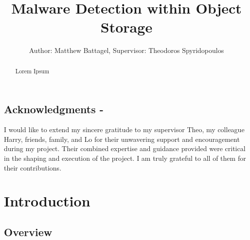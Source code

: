 \documentclass[12pt, conference, final, a4paper, onecolumn, compsoc]{IEEEtran}
\begin{document}
\title{Malware Detection within Object Storage} \author{Author: Matthew
  Battagel, Supervisor: Theodoros Spyridopoulos} 
\maketitle{}

\subsection*{Acknowledgments - }

I would like to extend my sincere gratitude to my supervisor Theo, my colleague
Harry, friends, family, and Lo for their unwavering support and encouragement
during my project. Their combined expertise and guidance provided were critical
in the shaping and execution of the project. I am truly grateful to all of them
for their contributions.

\bigskip

\begin{abstract}
  Lorem Ipsum
\end{abstract}

\pagebreak






\tableofcontents{}


\section{Introduction}
\subsection*{Overview}
\end{document}
